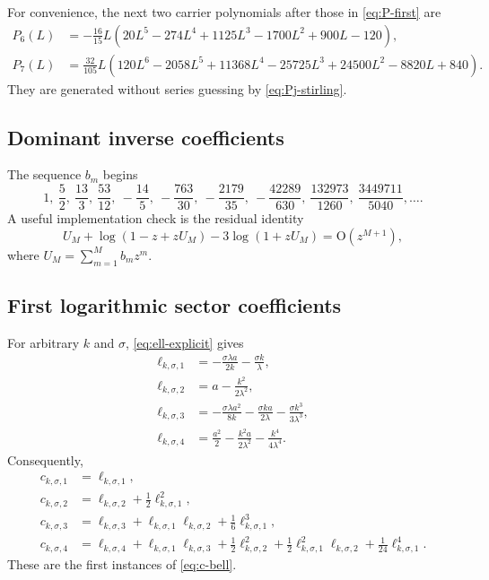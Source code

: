\documentclass[11pt,a4paper]{article}
\numberwithin{equation}{section}
\theoremstyle{remark}
\newcommand{\bigO}{\mathrm O}
\begin{document}
For convenience, the next two carrier polynomials after those in \cref{eq:P-first} are
\begin{align}
 P_6(L)
 &=-\frac{16}{15}L
 \left(20L^5-274L^4+1125L^3-1700L^2+900L-120\right),\\
 P_7(L)
 &=\frac{32}{105}L
 \left(120L^6-2058L^5+11368L^4-25725L^3
 +24500L^2-8820L+840\right).
\end{align}
They are generated without series guessing by \cref{eq:Pj-stirling}.

\subsection{Dominant inverse coefficients}

The sequence $b_m$ begins
\begin{equation}
 1,\ \frac52,\ \frac{13}{3},\ \frac{53}{12},\ -\frac{14}{5},\
 -\frac{763}{30},\ -\frac{2179}{35},\ -\frac{42289}{630},\
 \frac{132973}{1260},\ \frac{3449711}{5040},\ldots.
\end{equation}
A useful implementation check is the residual identity
\begin{equation}\label{eq:U-residual-order}
 U_M+\log(1-z+zU_M)-3\log(1+zU_M)=\bigO(z^{M+1}),
\end{equation}
where $U_M=\sum_{m=1}^{M}b_mz^m$.

\subsection{First logarithmic sector coefficients}

For arbitrary $k$ and $\sigma$, \cref{eq:ell-explicit} gives
\begin{align}
 \ell_{k,\sigma,1}
 &=-\frac{\sigma\lambda a}{2k}-\frac{\sigma k}{\lambda},\\
 \ell_{k,\sigma,2}
 &=a-\frac{k^2}{2\lambda^2},\\
 \ell_{k,\sigma,3}
 &=-\frac{\sigma\lambda a^2}{8k}
 -\frac{\sigma ka}{2\lambda}
 -\frac{\sigma k^3}{3\lambda^3},\\
 \ell_{k,\sigma,4}
 &=\frac{a^2}{2}
 -\frac{k^2a}{2\lambda^2}
 -\frac{k^4}{4\lambda^4}.
\end{align}
Consequently,
\begin{align}
 c_{k,\sigma,1}&=\ell_{k,\sigma,1},\\
 c_{k,\sigma,2}&=\ell_{k,\sigma,2}+\frac12\ell_{k,\sigma,1}^2,\\
 c_{k,\sigma,3}&=\ell_{k,\sigma,3}
 +\ell_{k,\sigma,1}\ell_{k,\sigma,2}
 +\frac16\ell_{k,\sigma,1}^3,\\
 c_{k,\sigma,4}&=\ell_{k,\sigma,4}
 +\ell_{k,\sigma,1}\ell_{k,\sigma,3}
 +\frac12\ell_{k,\sigma,2}^2
 +\frac12\ell_{k,\sigma,1}^2\ell_{k,\sigma,2}
 +\frac1{24}\ell_{k,\sigma,1}^4.
\end{align}
These are the first instances of \cref{eq:c-bell}.
\end{document}
